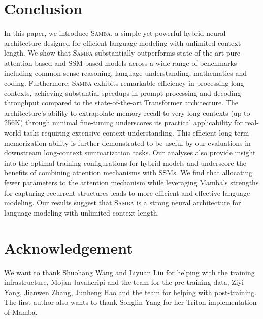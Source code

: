 \documentclass{article}
\begin{document}



\section{Conclusion}
In this paper, we introduce \textsc{Samba}, a simple yet powerful hybrid neural architecture designed for efficient language modeling with unlimited context length. We show that \textsc{Samba} substantially outperforms state-of-the-art pure attention-based and SSM-based models across a wide range of benchmarks including common-sense reasoning, language understanding, mathematics and coding.
Furthermore, \textsc{Samba} exhibits remarkable efficiency in processing long contexts, achieving substantial speedups in prompt processing and decoding throughput compared to the state-of-the-art Transformer architecture. The architecture's ability to extrapolate memory recall to very long contexts (up to 256K) through minimal fine-tuning underscores its practical applicability for real-world tasks requiring extensive context understanding. This efficient long-term memorization ability is further demonstrated to be useful by our evaluations in downstream long-context summarization tasks.
Our analyses also provide insight into the optimal training configurations for hybrid models and underscore the benefits of combining attention mechanisms with SSMs. We find that allocating fewer parameters to the attention mechanism while leveraging Mamba's strengths for capturing recurrent structures leads to more efficient and effective language modeling. Our results suggest that \textsc{Samba} is a strong neural architecture for language modeling with unlimited context length. 

% 

\section*{Acknowledgement}
We want to thank Shuohang Wang and Liyuan Liu for helping with the training infrastructure, Mojan Javaheripi and the team for the pre-training data, Ziyi Yang, Jianwen Zhang, Junheng Hao and the team for helping with post-training. The first author also wants to thank Songlin Yang for her Triton implementation of Mamba.
\end{document}
